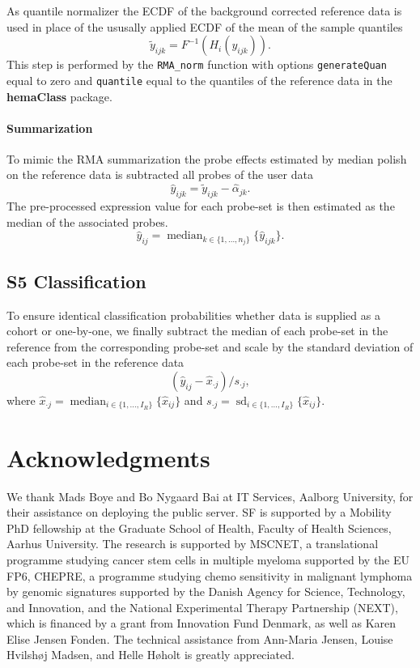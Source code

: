 \documentclass[10pt,letterpaper]{article}
\newcommand{\pkg}[1]{\textbf{#1}}
\DeclareMathOperator*{\median}{median}
\DeclareMathOperator*{\sd}{sd}
\begin{document}
As quantile normalizer the ECDF of the background corrected reference data is used in place of the ususally applied ECDF of the mean of the sample quantiles
\begin{equation*}
   \tilde{y}_{ijk} = F^{-1}(H_i(y_{ijk})).
\end{equation*}
This step is performed by the \texttt{RMA\_norm} function with options \texttt{generateQuan} equal to zero and \texttt{quantile} equal to the quantiles of the reference data in the \pkg{hemaClass} package.


\paragraph{Summarization}
To mimic the RMA summarization the probe effects estimated by median polish on the reference data is subtracted all probes of the user data
\begin{equation*}
   \hat{y}_{ijk} = \tilde{y}_{ijk} - \hat{\alpha}_{jk}.
\end{equation*}
The pre-processed expression value for each probe-set is then estimated as the median of the associated probes.
\begin{equation*}
   \hat{y}_{ij} = \median_{k \in \{1,\dots,n_j \}} \{ \hat{y}_{ijk} \}.
\end{equation*}


\subsection*{S5 Classification}
To ensure identical classification probabilities whether data is supplied as a cohort or one-by-one, we finally subtract the median of each probe-set in the reference from the corresponding probe-set and scale by the standard deviation of each probe-set in the reference data
\begin{equation*}
  (\hat{y}_{ij} - \hat{x}_{\cdot j})/s_{\cdot j},
\end{equation*}
where
$\hat{x}_{\cdot j} = \median_{i \in \{1,\dots,I_R \}} \{\hat{x}_{ij}\}$ and
$s_{\cdot j} = \sd_{i \in \{1,\dots,I_R\}} \{\hat{x}_{ij}\}$.


\section*{Acknowledgments}
We thank Mads Boye and Bo Nygaard Bai at IT Services, Aalborg University, for their assistance on deploying the public server.
SF is supported by a Mobility PhD fellowship at the Graduate School of Health, Faculty of Health Sciences, Aarhus University.
The research is supported by MSCNET, a translational programme studying cancer stem cells in multiple myeloma supported by the EU FP6, CHEPRE, a programme studying chemo sensitivity in malignant lymphoma by genomic signatures supported by the Danish Agency for Science, Technology, and Innovation, and the National Experimental Therapy Partnership (NEXT), which is financed by a grant from Innovation Fund Denmark, as well as Karen Elise Jensen Fonden.
The technical assistance from Ann-Maria Jensen, Louise Hvilsh{\o}j Madsen, and Helle H{\o}holt is greatly appreciated.
\end{document}
